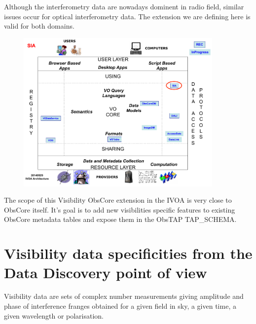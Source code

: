 \documentclass[11pt,a4paper]{ivoa}
\begin{document}
Although the interferometry data are nowadays dominent in radio field, similar issues occur for 
optical interferometry data. The extension we are defining here is valid for both domains.  


\begin{figure}[H]
\centering

\includegraphics[width=0.9\textwidth]{archdiag.png}
\label{fig:architecture}
\end{figure}


The scope of this Visibility ObsCore extension in the IVOA is very close to ObsCore itself. It's goal is to add new visibilities specific features to existing ObsCore metadata tables and expose them in the ObsTAP TAP\_SCHEMA. 

\section{Visibility data specificities from the Data Discovery point of view}
\label{sec:specificities}

    Visibility data are sets of  complex number measurements giving amplitude and phase of interference franges obtained for a given field in sky, a given time, a given wavelength or polarisation. 
\end{document}
